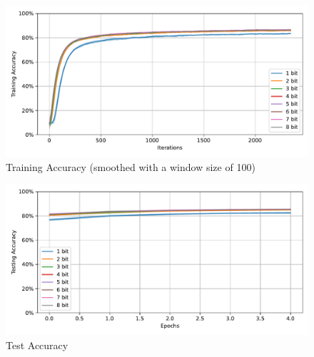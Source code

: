         \begin{figure}[H]
            \centering
            \includegraphics[width=\textwidth]{../standard/FashionMNIST/plots/fashionmnist_train_acc.pdf}
            \caption{Training Accuracy (smoothed with a window size of 100)}
        \end{figure}
        \begin{figure}[H]
            \centering
            \includegraphics[width=\textwidth]{../standard/FashionMNIST/plots/fashionmnist_test_acc.pdf}
            \caption{Test Accuracy}
        \end{figure}
